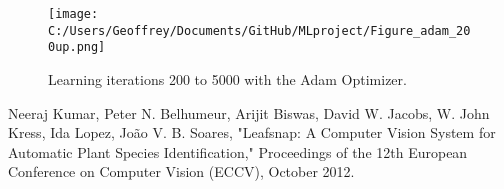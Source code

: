 \documentclass[12pt]{article}
\begin{document}
\begin{figure}
\texttt{[image: C:/Users/Geoffrey/Documents/GitHub/MLproject/Figure\_adam\_200up.png]}
\caption{Learning iterations 200 to 5000 with the Adam Optimizer.}
\end{figure}

\begin{thebibliography}{99}
 Neeraj Kumar, Peter N. Belhumeur, Arijit Biswas, David W. Jacobs, W. John Kress, Ida Lopez, Jo\~{a}o V. B. Soares, "Leafsnap: A Computer Vision System for Automatic Plant Species Identification," Proceedings of the 12th European Conference on Computer Vision (ECCV), October 2012.


\end{thebibliography}
\end{document}
